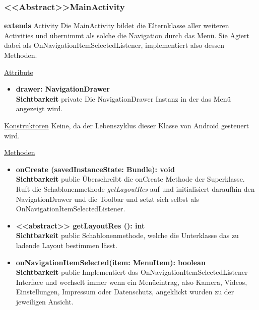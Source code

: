 \subsubsection{<<Abstract>>MainActivity} \label{app:klasse:MainActivity}
\textbf{extends} Activity \newline
Die MainActivity bildet die Elternklasse aller weiteren Activities und übernimmt als solche die Navigation durch das Menü. Sie Agiert dabei als OnNavigationItemSelectedListener, implementiert also dessen Methoden.
\newline

\underline{Attribute}
\begin{itemize}
\itemsep0pt
\item \textbf{drawer: NavigationDrawer} \hfill\\ 
\textbf{Sichtbarkeit} private\newline
Die NavigationDrawer Instanz in der das Menü angezeigt wird.

\end{itemize}

\underline{Konstruktoren}\newline
\indent Keine, da der Lebenszyklus dieser Klasse von Android gesteuert wird.\newline

\underline{Methoden}
\begin{itemize}
\itemsep0pt

\item \textbf{onCreate (savedInstanceState: Bundle): void}\hfill\\
\textbf{Sichtbarkeit} public\newline
Überschreibt die onCreate Methode der Superklasse. Ruft die Schablonenmethode \textit{getLayoutRes} auf und initialisiert daraufhin den NavigationDrawer und die Toolbar und setzt sich selbst als OnNavigationItemSelectedListener.

\item \textbf{ <<abstract>> getLayoutRes (): int}\hfill\\
\textbf{Sichtbarkeit} public\newline
Schablonenmethode, welche die Unterklasse das zu ladende Layout bestimmen lässt.

\item \textbf{onNavigationItemSelected(item: MenuItem): boolean}\hfill\\
\textbf{Sichtbarkeit} public\newline
Implementiert das OnNavigationItemSelectedListener Interface und wechselt immer wenn ein Menüeintrag, also Kamera, Videos, Einstellungen, Impressum oder Datenschutz, angeklickt wurden zu der jeweiligen Ansicht.

\end{itemize}